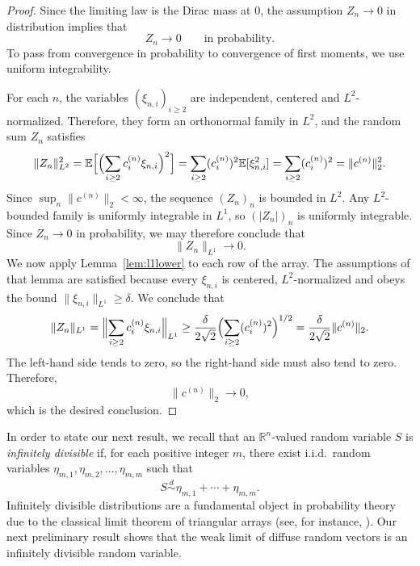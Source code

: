 \documentclass[11pt]{amsart}
\numberwithin{equation}{section}
\theoremstyle{definition}
\theoremstyle{remark}
\newcommand{\E}{\mathbb E}
\newcommand{\R}{\mathbb R}
\newcommand{\norm}[1]{\lVert #1 \rVert}
\begin{document}
\begin{proof}
Since the limiting law is the Dirac mass at $0$, the assumption
$Z_n\to0$ in distribution implies that
\[
Z_n\to0
\qquad\text{in probability.}
\]
To pass from convergence in probability to convergence of first moments, we use
uniform integrability.

For each $n$, the variables $(\xi_{n,i})_{i\ge2}$ are independent, centered
and $L^2$-normalized.  Therefore, they form an orthonormal family in $L^2$, and
the random sum $Z_n$ satisfies
\[
\norm{Z_n}_{L^2}^2
=\E\Bigl[\Bigl(\sum_{i\ge2} c_i^{(n)}\xi_{n,i}\Bigr)^2\Bigr]
=\sum_{i\ge2}(c_i^{(n)})^2\E[\xi_{n,i}^2]
=\sum_{i\ge2}(c_i^{(n)})^2
=\norm{c^{(n)}}_2^2.
\]
Since $\sup_n \norm{c^{(n)}}_2<\infty$, the sequence $(Z_n)_n$ is bounded in
$L^2$.  Any $L^2$-bounded family is uniformly integrable in $L^1$, so
$(|Z_n|)_n$ is uniformly integrable.  Since $Z_n\to0$ in probability, we may
therefore conclude that
\[
\norm{Z_n}_{L^1}\longrightarrow0.
\]
We now apply Lemma~\ref{lem:l1lower} to each row of the array.  The assumptions of
that lemma are satisfied because every $\xi_{n,i}$ is centered,
$L^2$-normalized and obeys the bound $\norm{\xi_{n,i}}_{L^1}\ge\delta$.  We conclude that
\[
\norm{Z_n}_{L^1}
=\Bigl\|\sum_{i\ge2} c_i^{(n)}\xi_{n,i}\Bigr\|_{L^1}
\ge
\frac{\delta}{2\sqrt2}
\Bigl(\sum_{i\ge2}(c_i^{(n)})^2\Bigr)^{1/2}
=\frac{\delta}{2\sqrt2}\norm{c^{(n)}}_2.
\]
The left-hand side tends to zero, so the right-hand side must also tend to
zero.  Therefore,
\[
\norm{c^{(n)}}_2\longrightarrow0,
\]
which is the desired conclusion.
\end{proof}
In order to state our next result, we recall that an $\R^n$-valued random variable $S$ is \emph{infinitely divisible} if, for each positive integer $m$, there exist i.i.d.~random variables $\eta_{m,1},\eta_{m,2},\dots,\eta_{m,m}$ such that 
\[
S \overset{d}{\sim} \eta_{m,1} + \cdots + \eta_{m,m}. 
\]
Infinitely divisible distributions are a fundamental object in probability theory due to the classical limit theorem of triangular arrays (see, for instance, \cite[Chapter~IV]{gnedenko-kolmogorov}).
Our next preliminary result shows that the weak limit of diffuse random vectors is an infinitely divisible random variable. 
\end{document}
